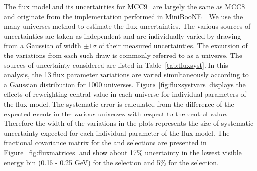 The flux model and its uncertainties for MCC9~\cite{bib:fluxmcc9,bib:fluxtechnote} are largely the same as MCC8~\cite{bib:fluxtechnote} and originate from the implementation performed in MiniBooNE~\cite{bib:MBflux}. We use the many universes method to estimate the flux uncertainties. The various sources of uncertainties are taken as independent and  are individually varied by drawing from a Gaussian of width $\pm 1 \sigma$ of their measured uncertainties. The excursion of the variations from each such draw is commonly referred to as a universe. The sources of uncertainty considered are listed in Table~\ref{tab:fluxsyst}. In this analysis, the 13 flux parameter variations are varied simultaneously according to a Gaussian distribution for 1000 universes.
Figure~\ref{fig:fluxsystvars} displays the effects of reweighting central value in each universe for individual parameters of the flux model. The systematic error is calculated from the difference of the expected events in the various universes with respect to the central value. Therefore the width of the variations in the plots represents the size of systematic uncertainty expected for each individual parameter of the flux model.
The fractional covariance matrix for the \npsel and \zpsel selections are presented in Figure~\ref{fig:fluxmatrices} and show about 17\% uncertainty in the lowest visible energy bin (0.15 - 0.25 GeV) for the \npsel selection and 5\% for the \zpsel selection. %

